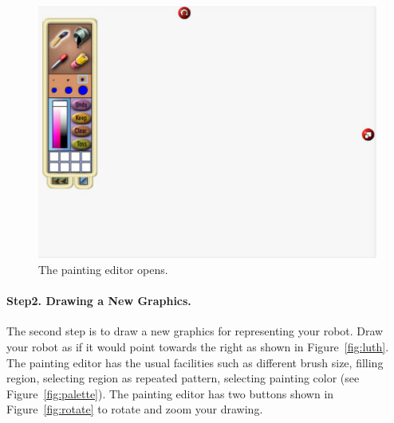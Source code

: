 
\begin{figure}
\begin{center}
\includegraphics[width=14cm]{paintOpen}
\caption{The painting editor opens. \label{fig:paintOpen}}
\end{center}
\end{figure}

\paragraph{Step2. Drawing  a New Graphics. }
The second step is to draw a new graphics for representing your robot. Draw your robot as if it would point towards the right as shown in Figure~\ref{fig:luth}. The painting editor has the usual facilities such as different brush size, filling region, selecting region as repeated pattern, selecting painting color (see Figure~\ref{fig:palette}). The painting editor has two buttons shown in Figure~\ref{fig:rotate}  to rotate and zoom your drawing. 

